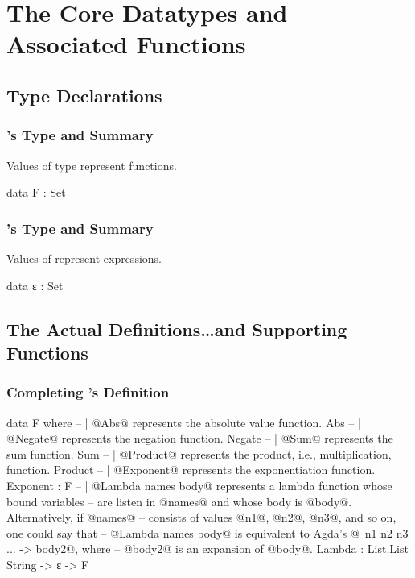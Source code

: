 \documentclass{report}
\begin{document}
\chapter{The Core Datatypes and Associated Functions}

\section{Type Declarations}

\subsection{'s Type and Summary}
Values of type  represent functions.

\begin{code}
data F : Set
\end{code}

\subsection{'s Type and Summary}
Values of  represent expressions.

\begin{code}
data ε : Set
\end{code}

\section{The Actual Definitions\ldots and Supporting Functions}

\subsection{Completing 's Definition}

\begin{code}
data F where
  -- | @Abs@ represents the absolute value function.
  Abs
   -- | @Negate@ represents the negation function.
   Negate
   -- | @Sum@ represents the sum function.
   Sum
   -- | @Product@ represents the product, i.e., multiplication, function.
   Product
   -- | @Exponent@ represents the exponentiation function.
   Exponent : F
  -- | @Lambda names body@ represents a lambda function whose bound variables
  -- are listen in @names@ and whose body is @body@.  Alternatively, if @names@
  -- consists of values @n1@, @n2@, @n3@, and so on, one could say that
  -- @Lambda names body@ is equivalent to Agda's @\ n1 n2 n3 ... -> body2@, where
  -- @body2@ is an expansion of @body@.
  Lambda : List.List String -> ε -> F
\end{code}
\end{document}
